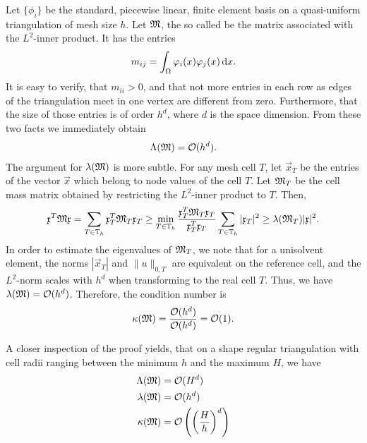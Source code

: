 \begin{example}
  Let $\{\phi_i\}$ be the standard, piecewise linear, finite element
  basis on a quasi-uniform triangulation of mesh size $h$. Let $\mathfrak{M}$, the so called  be the matrix associated with
  the $L^2$-inner product. It has the entries
  \begin{gather*}
    m_{ij} = \int_\Omega \varphi_i(x) \varphi_j(x) \,\mathrm{d} x.
  \end{gather*}
  It is easy to verify, that $m_{ii}> 0$, and that not more
  entries in each row as edges of the triangulation meet in one vertex
  are different from zero. Furthermore, that the size of those entries
  is of order $h^d$, where $d$ is the space dimension. From these two
  facts we immediately obtain
  \begin{gather*}
    \Lambda(\mathfrak{M}) = \mathcal O(h^{d}).
  \end{gather*}
  The argument for $\lambda(\mathfrak{M})$ is more subtle. For any mesh cell
  $T$, let $\vec x_T$ be the entries of the vector $\vec x$ which
  belong to node values of the cell $T$. Let $\mathfrak{M}_T$ be the cell
  mass matrix obtained by restricting the $L^2$-inner product to
  $T$. Then,
  \begin{gather*}
    \mathfrak{x}^T \mathfrak{M} \mathfrak{x}
    = \sum_{T\in\mathbb T_h} \mathfrak{x}^T_T \mathfrak{M}_T \mathfrak{x}_T
    \ge \min_{T\in\mathbb T_h} \frac{\mathfrak{x}^T_T \mathfrak{M}_T \mathfrak{x}_T}{\mathfrak{x}^T_T\mathfrak{x}_T}
    \sum_{T\in\mathbb T_h} |\mathfrak{x}_T|^2 \ge \lambda(\mathfrak{M}_T)  |\mathfrak{x}|^2.
  \end{gather*}
  In order to estimate the eigenvalues of $\mathfrak{M}_T$, we note that for
  a unisolvent element, the norms $|\vec x_T|$ and $\|u\|_{0,T}$ are
  equivalent on the reference cell, and the $L^2$-norm scales with
  $h^d$ when transforming to the real cell $T$. Thus, we have
  $\lambda(\mathfrak{M}) = \mathcal O(h^{d})$.
  Therefore, the condition number is
  \begin{gather*}
    \kappa(\mathfrak{M}) = \frac{\mathcal O(h^{d})}{\mathcal O(h^{d})} = {\mathcal O(1)}.
  \end{gather*}
\end{example}

\begin{note}
  A closer inspection of the proof yields, that on a shape regular
  triangulation with cell radii ranging between the minimum $h$ and
  the maximum $H$, we have
  \begin{align*}
    \Lambda(\mathfrak{M}) &= \mathcal O(H^{d}) \\
    \lambda(\mathfrak{M}) &= \mathcal O(h^{d}) \\
    \kappa(\mathfrak{M}) &= \mathcal O\left(\left(\frac Hh\right)^{d}\right)
  \end{align*}
\end{note}

